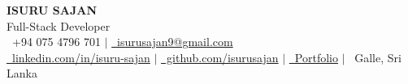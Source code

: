 \documentclass[letterpaper,11pt]{article}
\begin{document}
\begin{center}
    {\Huge\bfseries\color{darkgray} ISURU SAJAN} \\[3pt]
    {\Large\color{mediumgray} Full-Stack Developer} \\[6pt]
    \normalsize
    \faPhone\ +94 075 4796 701 $|$
    \href{mailto:isurusajan9@gmail.com}{\textcolor{primaryblue}{\faEnvelope\ isurusajan9@gmail.com}} \\
    \href{https://linkedin.com/in/isuru-sajan}{\textcolor{primaryblue}{\faLinkedin\ linkedin.com/in/isuru-sajan}} $|$
    \href{https://github.com/isurusajan}{\textcolor{primaryblue}{\faGithub\ github.com/isurusajan}} $|$
    \href{https://myportofolioisuru.netlify.app/}{\textcolor{primaryblue}{\faGlobe\ Portfolio}} $|$
    \faMapMarker\ Galle, Sri Lanka
\end{center}
\vspace{-8pt}
\end{document}
